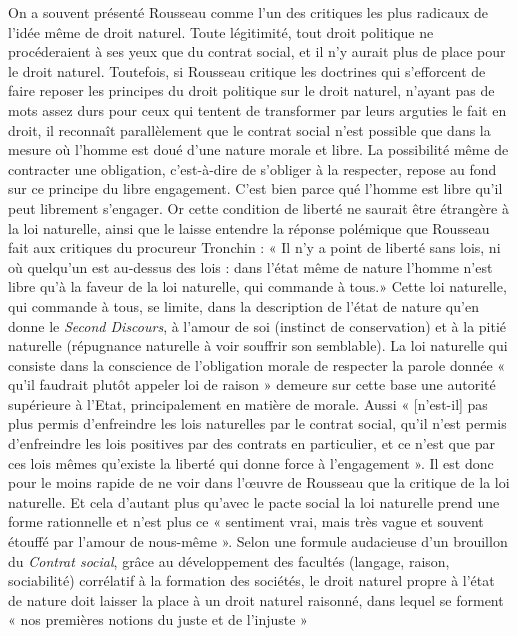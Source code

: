 On a souvent présenté Rousseau
comme l’un des critiques les plus radicaux
de l’idée même de droit naturel. Toute
légitimité, tout droit politique ne procéderaient à ses yeux que du contrat social, et
il n’y aurait plus de place pour le droit
naturel. Toutefois, si Rousseau critique
les doctrines qui s’efforcent de faire reposer les principes du droit politique sur le
droit naturel, n'ayant pas de mots assez
durs pour ceux qui tentent de transformer
par leurs arguties le fait en droit, il reconnaît parallèlement que le contrat social
n’est possible que dans la mesure où
l’homme est doué d’une nature morale et
libre. La possibilité même de contracter
une obligation, c’est-à-dire de s’obliger à
la respecter, repose au fond sur ce principe du libre engagement. C’est bien
parce qué l’homme est libre qu'il peut
librement s'engager. Or cette condition
de liberté ne saurait être étrangère à la loi
naturelle, ainsi que le laisse entendre la
réponse polémique que Rousseau fait aux
critiques du procureur Tronchin : « Il n’y
a point de liberté sans lois, ni où quelqu'un est au-dessus des lois : dans l’état
même de nature l’homme n'est libre qu’à
la faveur de la loi naturelle, qui commande à tous.» Cette loi naturelle, qui
%
commande à tous, se limite, dans la description de l’état de nature qu’en donne
le {\it Second Discours}, à l'amour de soi (instinct de conservation)
 et à la pitié naturelle (répugnance naturelle à voir souffrir
son semblable). La loi naturelle qui
consiste dans la conscience de l’obligation
morale de respecter la parole donnée
« qu’il faudrait plutôt appeler loi de raison » demeure sur cette base une autorité
supérieure à l'Etat, principalement en
matière de morale. Aussi « [n'est-il] pas
plus permis d’enfreindre les lois naturelles
par le contrat social, qu'il n’est permis
d’enfreindre les lois positives par des
contrats en particulier, et ce n’est que par
ces lois mêmes qu'existe la liberté qui
donne force à l’engagement ». Il est donc
pour le moins rapide de ne voir dans
l’œuvre de Rousseau que la critique de la
loi naturelle. Et cela d’autant plus qu'avec
le pacte social la loi naturelle prend une
forme rationnelle et n’est plus ce « sentiment vrai, mais très vague et souvent
étouffé par l’amour de nous-même ».
Selon une formule audacieuse d’un brouillon du {\it Contrat social}, grâce au développement des facultés (langage, raison,
sociabilité) corrélatif à la formation des
sociétés, le droit naturel propre à l’état de
nature doit laisser la place à un droit naturel raisonné, dans lequel se forment « nos
premières notions du juste et de l’injuste »

